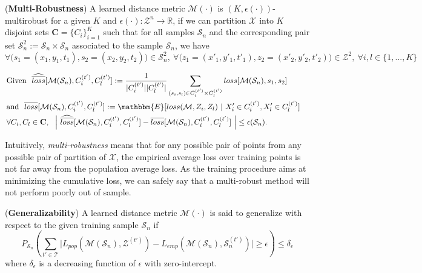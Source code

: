 \begin{define}
(\textbf{Multi-Robustness})
A learned distance metric $\mathcal{M}(\cdot)$ is $(K,\epsilon(\cdot))$-multirobust for a given $K$ and $\epsilon(\cdot):\mathcal{Z}^n \to \mathbb{R}$, if we can partition $\mathcal{X}$ into $K$ disjoint sets $\textbf{C} = \{C_i\}_{i=1}^K$ such that for all samples $\mathcal{S}_n$ and the corresponding pair set $\mathcal{S}_n^2 := \mathcal{S}_n \times \mathcal{S}_n$ associated to the sample $\mathcal{S}_n$, we have
$\forall\big(s_1=(x_1,y_1,t_1),s_2=(x_2,y_2,t_2)\big)\in\mathcal{S}_n^2,~\forall\big(z_1=(x'_1,y'_1,t'_1),z_2=(x'_2,y'_2,t'_2)\big)\in\mathcal{Z}^2,~\forall i,l \in \{1,...,K\}$ 

\begin{eqnarray*}
\left.\begin{aligned}
&
\mathrm{Given } \ \  \widehat{\overline{loss}}[\mathcal{M}(\mathcal{S}_n),C^{(t')}_i,C^{(t')}_l] := \frac{1}{|C^{(t')}_i| |C^{(t')}_l|}\sum_{(s_i,s_l)\in C^{(t')}_i\times C^{(t')}_l} loss[\mathcal{M}(\mathcal{S}_n),s_1,s_2] & \\ 
&
\mathrm{ and } \ \  \overline{loss}[\mathcal{M}(\mathcal{S}_n),C^{(t')}_i,C^{(t')}_l] := \mathbbm{E}[loss(\mathcal{M},Z_i,Z_l) ~|~ X_i^\prime\in C_i^{(t^\prime)}, X_l^\prime\in C_l^{(t^\prime)}]\\
& \forall C_i,C_l \in \textbf{C}, \ \ \Big|~ \widehat{\overline{loss}}[\mathcal{M}(\mathcal{S}_n),C^{(t')}_i,C^{(t')}_l] - \overline{loss}[\mathcal{M}(\mathcal{S}_n),C^{(t')}_i,C^{(t')}_l]~ \Big|\leq \epsilon(\mathcal{S}_n). & 
\end{aligned}\right.
\end{eqnarray*}
\end{define} 

Intuitively, \textit{multi-robustness} means that for any possible pair of points from any possible pair of partition of $\mathcal{X}$, the empirical average loss over training points is not far away from the population average loss. As the training procedure aims at minimizing the cumulative loss, we can safely say that a multi-robust method will not perform poorly out of sample.

\begin{define}
(\textbf{Generalizability}) 
A learned distance metric $\mathcal{M}(\cdot)$ is said to generalize with respect to the given training sample $\mathcal{S}_n$ if 
$$ %
P_{\mathcal{S}_n}\left(\sum_{t'\in\mathcal{T}}\Big| L_{pop}(\mathcal{M}(\mathcal{S}_n),\mathcal{Z}^{(t')}) - L_{emp}(\mathcal{M}(\mathcal{S}_n),\mathcal{S}^{(t')}_n) \Big| \geq \epsilon \right) \leq \delta_\epsilon$$
where $\delta_\epsilon$ is a decreasing function of $\epsilon$ with zero-intercept.
\end{define}

